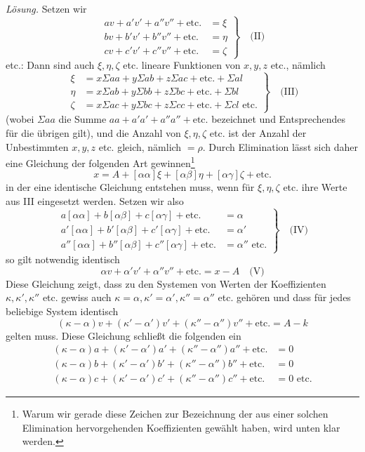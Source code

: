 \textit{Lösung.} Setzen wir
\[
\left.\begin{aligned}
av+a'v'+a''v''+\text{etc.}&=\xi\\
bv+b'v'+b''v''+\text{etc.}&=\eta\\
cv+c'v'+c''v''+\text{etc.}&=\zeta
\end{aligned}\right\}\quad\text{(II)}
\]
etc.: Dann sind auch \(\xi,\eta,\zeta\) etc. lineare Funktionen von \(x,y,z\) etc., nämlich
\[
\left.\begin{aligned}
\xi&=x\Sigma aa+y\Sigma ab+z\Sigma ac+\text{etc.}+\Sigma al\\
\eta&=x\Sigma ab+y\Sigma bb+z\Sigma bc+\text{etc.}+\Sigma bl\\
\zeta&=x\Sigma ac+y\Sigma bc+z\Sigma cc+\text{etc.}+\Sigma cl\text{ etc.}
\end{aligned}\right\}\quad\text{(III)}
\]
(wobei \(\Sigma aa\) die Summe \(aa+a'a'+a''a''+\text{etc.}\) bezeichnet und Entsprechendes für die übrigen gilt), und die Anzahl von \(\xi,\eta,\zeta\) etc. ist der Anzahl der Unbestimmten \(x,y,z\) etc. gleich, nämlich \(=\rho\). Durch Elimination lässt sich daher eine Gleichung der folgenden Art gewinnen\footnote{Warum wir gerade diese Zeichen zur Bezeichnung der aus einer solchen Elimination hervorgehenden Koeffizienten gewählt haben, wird unten klar werden.}
\[
x=A+[\alpha\alpha]\xi+[\alpha\beta]\eta+[\alpha\gamma]\zeta+\text{etc.}
\]
in der eine identische Gleichung entstehen muss, wenn für \(\xi,\eta,\zeta\) etc. ihre Werte aus III eingesetzt werden. Setzen wir also
\[
\left.\begin{aligned}
a[\alpha\alpha]+b[\alpha\beta]+c[\alpha\gamma]+\text{etc.}&=\alpha\\
a'[\alpha\alpha]+b'[\alpha\beta]+c'[\alpha\gamma]+\text{etc.}&=\alpha'\\
a''[\alpha\alpha]+b''[\alpha\beta]+c''[\alpha\gamma]+\text{etc.}&=\alpha''\text{ etc.}
\end{aligned}\right\}\quad\text{(IV)}
\]
so gilt notwendig identisch
\[
\alpha v+\alpha'v'+\alpha''v''+\text{etc.}=x-A\quad\text{(V)}
\]
Diese Gleichung zeigt, dass zu den Systemen von Werten der Koeffizienten \(\kappa,\kappa',\kappa''\) etc. gewiss auch \(\kappa=\alpha,\kappa'=\alpha',\kappa''=\alpha''\) etc. gehören und dass für jedes beliebige System identisch
\[
(\kappa-\alpha)v+(\kappa'-\alpha')v'+(\kappa''-\alpha'')v''+\text{etc.}=A-k
\]
gelten muss. Diese Gleichung schließt die folgenden ein
\[
\begin{aligned}
(\kappa-\alpha)a+(\kappa'-\alpha')a'+(\kappa''-\alpha'')a''+\text{etc.}&=0\\
(\kappa-\alpha)b+(\kappa'-\alpha')b'+(\kappa''-\alpha'')b''+\text{etc.}&=0\\
(\kappa-\alpha)c+(\kappa'-\alpha')c'+(\kappa''-\alpha'')c''+\text{etc.}&=0\text{ etc.}
\end{aligned}
\]
